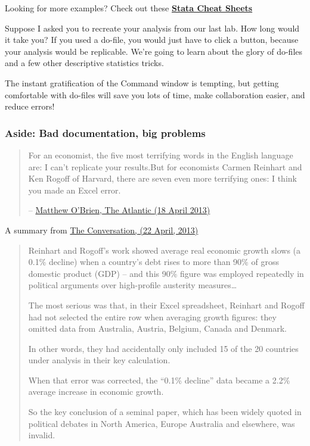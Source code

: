 \documentclass[11pt]{article}
\begin{document}
Looking for more examples? Check out these
\href{https://geocenter.github.io/StataTraining/portfolio/01_resource/}{\textbf{Stata
Cheat Sheets}}

Suppose I asked you to recreate your analysis from our last lab. How
long would it take you? If you used a do-file, you would just have to
click a button, because your analysis would be replicable. We're going
to learn about the glory of do-files and a few other descriptive
statistics tricks.

The instant gratification of the Command window is tempting, but getting
comfortable with do-files will save you lots of time, make collaboration
easier, and reduce errors!

\hypertarget{aside-bad-documentation-big-problems}{%
\subsubsection*{Aside: Bad documentation, big
problems}\label{aside-bad-documentation-big-problems}}

\begin{quote}
For an economist, the ﬁve most terrifying words in the English language
are: I can't replicate your results.But for economists Carmen Reinhart
and Ken Rogoﬀ of Harvard, there are seven even more terrifying ones: I
think you made an Excel error.

--
\href{https://www.theatlantic.com/business/archive/2013/04/forget-excel-this-was-reinhart-and-rogoffs-biggest-mistake/275088/}{Matthew
O'Brien, The Atlantic (18 April 2013)}
\end{quote}

A summary from
\href{https://theconversation.com/the-reinhart-rogoff-error-or-how-not-to-excel-at-economics-13646}{The
Conversation, (22 April, 2013)}

\begin{quote}
Reinhart and Rogoff's work showed average real economic growth slows (a
0.1\% decline) when a country's debt rises to more than 90\% of gross
domestic product (GDP) -- and this 90\% figure was employed repeatedly
in political arguments over high-profile austerity measures\ldots{}

The most serious was that, in their Excel spreadsheet, Reinhart and
Rogoff had not selected the entire row when averaging growth figures:
they omitted data from Australia, Austria, Belgium, Canada and Denmark.

In other words, they had accidentally only included 15 of the 20
countries under analysis in their key calculation.

When that error was corrected, the ``0.1\% decline'' data became a 2.2\%
average increase in economic growth.

So the key conclusion of a seminal paper, which has been widely quoted
in political debates in North America, Europe Australia and elsewhere,
was invalid.
\end{quote}
\end{document}
